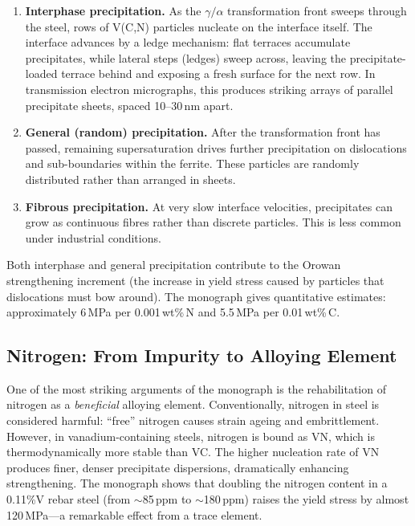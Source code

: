 \documentclass[11pt,a4paper]{article}
\begin{document}
\begin{enumerate}
  \item \textbf{Interphase precipitation.}  As the $\gamma/\alpha$
    transformation front sweeps through the steel, rows of V(C,N)
    particles nucleate on the interface itself.  The interface advances by
    a ledge mechanism: flat terraces accumulate precipitates, while
    lateral steps (ledges) sweep across, leaving the precipitate-loaded
    terrace behind and exposing a fresh surface for the next row.  In
    transmission electron micrographs, this produces striking arrays of
    parallel precipitate sheets, spaced 10--30\,nm apart.

  \item \textbf{General (random) precipitation.}  After the
    transformation front has passed, remaining supersaturation drives
    further precipitation on dislocations and sub-boundaries within the
    ferrite.  These particles are randomly distributed rather than
    arranged in sheets.

  \item \textbf{Fibrous precipitation.}  At very slow interface
    velocities, precipitates can grow as continuous fibres rather than
    discrete particles.  This is less common under industrial conditions.
\end{enumerate}

Both interphase and general precipitation contribute to the Orowan
strengthening increment (the increase in yield stress caused by
particles that dislocations must bow around).  The monograph gives
quantitative estimates: approximately 6\,MPa per 0.001\,wt\%\,N and
5.5\,MPa per 0.01\,wt\%\,C.

\subsection{Nitrogen: From Impurity to Alloying Element}

One of the most striking arguments of the monograph is the
rehabilitation of nitrogen as a \emph{beneficial} alloying element.
Conventionally, nitrogen in steel is considered harmful: ``free'' nitrogen
causes strain ageing and embrittlement.  However, in vanadium-containing
steels, nitrogen is bound as VN, which is thermodynamically more stable
than VC.  The higher nucleation rate of VN produces finer, denser
precipitate dispersions, dramatically enhancing strengthening.  The
monograph shows that doubling the nitrogen content in a 0.11\%V rebar
steel (from $\sim$85\,ppm to $\sim$180\,ppm) raises the yield stress
by almost 120\,MPa---a remarkable effect from a trace element.
\end{document}
